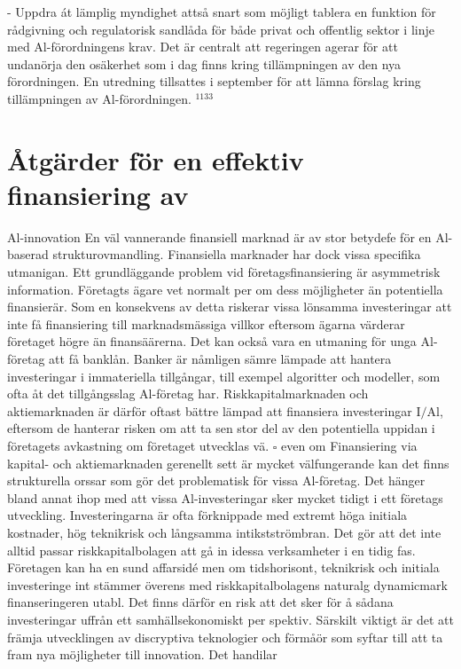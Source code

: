 {{{{{{{{{{{{{- Uppdra át lämplig myndighet attså snart som möjligt tablera en funktion för rådgivning och regulatorisk sandlåda för både privat och offentlig sektor i linje med Al-förordningens krav. Det är centralt att regeringen agerar för att undanörja den osäkerhet som i dag finns kring tillämpningen av den nya förordningen. En utredning tillsattes i september för att lämna förslag kring tillämpningen av Al-förordningen. \({ }^{1133}\)
\section*{Åtgärder för en effektiv finansiering av}
Al-innovation
En väl vannerande finansiell marknad är av stor betydefe för en Al-baserad strukturovmandling. Finansiella marknader har dock vissa specifika utmanigan. Ett grundläggande problem vid företagsfinansiering är asymmetrisk information. Företagts ägare vet normalt per om dess möjligheter än potentiella finansierär. Som en konsekvens av detta riskerar vissa lönsamma investeringar att inte få finansiering till marknadsmässiga villkor eftersom ägarna värderar företaget högre än finansäärerna.
Det kan också vara en utmaning för unga Al-företag att få banklån. Banker är nåmligen sämre lämpade att hantera investeringar i immateriella tillgångar, till exempel algoritter och modeller, som ofta åt det tillgångsslag Al-företag har. Riskkapitalmarknaden och aktiemarknaden är därför oftast bättre lämpad att finansiera investeringar \(\mathrm{I} / \mathrm{Al}\), eftersom de hanterar risken om att ta sen stor del av den potentiella uppidan i företagets avkastning om företaget utvecklas vä.
\(\square\) even om Finansiering via kapital- och aktiemarknaden gerenellt sett är mycket välfungerande kan det finns strukturella orssar som gör det problematisk för vissa Al-företag. Det hänger bland annat ihop med att vissa Al-investeringar sker mycket tidigt i ett företags utveckling. Investeringarna är ofta förknippade med extremt höga initiala kostnader, hög teknikrisk och långsamma intikstströmbran. Det gör att det inte alltid passar riskkapitalbolagen att gå in idessa verksamheter i en tidig fas. Företagen kan ha en sund affarsidé men om tidshorisont, teknikrisk och initiala investeringe int stämmer överens med riskkapitalbolagens naturalg dynamicmark finanseringeren utabl. Det finns därför en risk att det sker för å sådana investeringar uffrån ett samhällsekonomiskt per spektiv. Särskilt viktigt är det att främja utvecklingen av discryptiva teknologier och förmåör som syftar till att ta fram nya möjligheter till innovation. Det handilar
}}}}}}}}}}}}}
